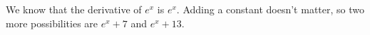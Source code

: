 We know that the derivative of $e^x$ is $e^x$. Adding a constant
doesn't matter, so two more possibilities are $e^x+7$ and $e^x+13$.
